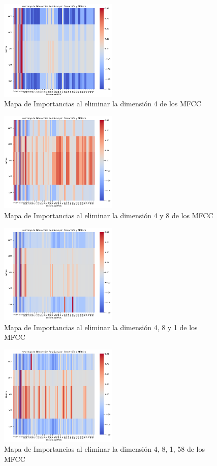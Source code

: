 \documentclass[conference]{IEEEtran}
\begin{document}
\begin{figure}[h]
\centering
\includegraphics[width=0.5\textwidth]{images/importance_plot_no_dims_4.png}
\caption{Mapa de Importancias al eliminar la dimensión 4 de los MFCC}
\end{figure}

\begin{figure}[h]
\centering
\includegraphics[width=0.5\textwidth]{images/importance_plot_no_dims_4-8.png}
\caption{Mapa de Importancias al eliminar la dimensión 4 y 8 de los MFCC}
\end{figure}

\begin{figure}[h]
\centering
\includegraphics[width=0.5\textwidth]{images/importance_plot_no_dims_4-8-1.png}
\caption{Mapa de Importancias al eliminar la dimensión 4, 8 y 1 de los MFCC}
\end{figure}

\begin{figure}[h]
\centering
\includegraphics[width=0.5\textwidth]{images/importance_plot_no_dims_4-8-1-58.png}
\caption{Mapa de Importancias al eliminar la dimensión 4, 8, 1, 58 de los MFCC}
\end{figure}
\end{document}
